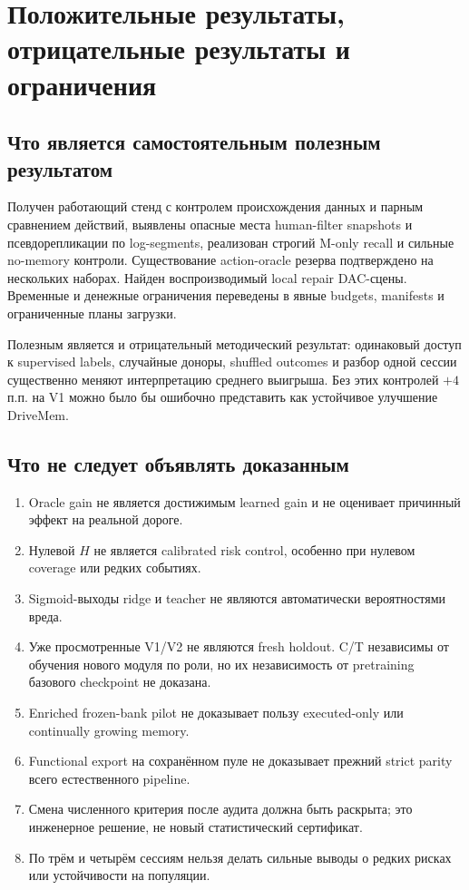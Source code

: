 \documentclass[11pt,a4paper]{article}
\begin{document}
\section{Положительные результаты, отрицательные результаты и ограничения}
\subsection{Что является самостоятельным полезным результатом}
Получен работающий стенд с контролем происхождения данных и парным сравнением действий, выявлены опасные места human-filter snapshots и псевдорепликации по log-segments, реализован строгий M-only recall и сильные no-memory контроли. Существование action-oracle резерва подтверждено на нескольких наборах. Найден воспроизводимый local repair DAC-сцены. Временные и денежные ограничения переведены в явные budgets, manifests и ограниченные планы загрузки.

Полезным является и отрицательный методический результат: одинаковый доступ к supervised labels, случайные доноры, shuffled outcomes и разбор одной сессии существенно меняют интерпретацию среднего выигрыша. Без этих контролей $+4$ п.п. на V1 можно было бы ошибочно представить как устойчивое улучшение DriveMem.

\subsection{Что не следует объявлять доказанным}
\begin{enumerate}
\item Oracle gain не является достижимым learned gain и не оценивает причинный эффект на реальной дороге.
\item Нулевой $H$ не является calibrated risk control, особенно при нулевом coverage или редких событиях.
\item Sigmoid-выходы ridge и teacher не являются автоматически вероятностями вреда.
\item Уже просмотренные V1/V2 не являются fresh holdout. C/T независимы от обучения нового модуля по роли, но их независимость от pretraining базового checkpoint не доказана.
\item Enriched frozen-bank pilot не доказывает пользу executed-only или continually growing memory.
\item Functional export на сохранённом пуле не доказывает прежний strict parity всего естественного pipeline.
\item Смена численного критерия после аудита должна быть раскрыта; это инженерное решение, не новый статистический сертификат.
\item По трём и четырём сессиям нельзя делать сильные выводы о редких рисках или устойчивости на популяции.
\end{enumerate}
\end{document}
